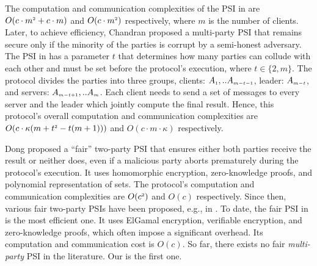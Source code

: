 The computation and communication complexities of the PSI in  \cite{DBLP:conf/ccs/KolesnikovMPRT17} are  $O(c\cdot m^{\scriptscriptstyle 2}+c\cdot m )$ and $O(c\cdot m^{\scriptscriptstyle 2})$ respectively, where $m$ is the number of clients. Later, to achieve efficiency, Chandran \et \cite{ChandranD0OSS21} proposed a multi-party PSI that remains secure only if the minority of the parties is corrupt by a semi-honest adversary. The PSI in \cite{NevoTY21} has a parameter $t$ that determines how many parties can collude with each other and must be set before the protocol's execution, where $t\in \{2, m\}$. The protocol divides the parties into three groups, clients: $A_{\scriptscriptstyle 1},..A_{\scriptscriptstyle m-t-1}$, leader: $A_{\scriptscriptstyle m-t}$, and servers: $A_{\scriptscriptstyle m-t+1},..A_{\scriptscriptstyle m}$. Each client needs to send a set of messages to every server and the leader which jointly compute the final result. Hence, this protocol's overall computation and communication complexities are $O(c\cdot \kappa(m+t^{\scriptscriptstyle 2}-t(m+1)))$ and $O(c\cdot m\cdot \kappa)$ respectively.

Dong \et proposed a ``fair'' two-party PSI \cite{DBLP:conf/dbsec/DongCCR13} that ensures either both parties receive the result or neither does, even if a malicious party aborts prematurely during the protocol's execution. It uses homomorphic encryption,  zero-knowledge proofs, and polynomial representation of sets. The protocol's computation and communication complexities are $O(c^{\scriptscriptstyle 2})$ and $O(c)$  respectively. Since then, various fair two-party PSIs have been proposed, e.g.,  in \cite{DebnathD14,DebnathD16-,DebnathD16}. To date, the fair PSI in \cite{DebnathD16} is the most efficient one. It uses ElGamal encryption, verifiable encryption, and zero-knowledge proofs, which often impose a significant overhead. Its computation and communication cost is $O(c)$. So far, there exists no fair \emph{multi-party} PSI in the literature. Our \withFai is the first one.%


